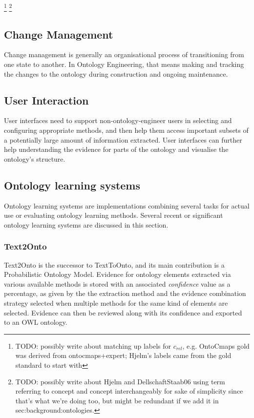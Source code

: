 \documentclass[a4paper]{report}
\newcommand{\todo}[1]{\footnote{{\color{red} TODO: #1}}}
\begin{document}
\todo{possibly write about matching up labels for \(c_{rel}\), e.g. OntoCmaps gold was derived from ontocmaps+expert; Hjelm's labels came from the gold standard to start with}
\todo{possibly write about Hjelm and DellschaftStaab06 using term referring to concept and concept interchangeably for sake of simplicity since that's what we're doing too, but might be redundant if we add it in sec:background:ontologies.}

\subsection{Change Management}

Change management is generally an organisational process of transitioning from one state to another.
In Ontology Engineering, that means making and tracking the changes to the ontology during construction and ongoing maintenance.

\subsection{User Interaction}
\label{subsec:background:ui}

User interfaces need to support non-ontology-engineer users in selecting and configuring appropriate methods, and then help them access important subsets of a potentially large amount of information extracted.
User interfaces can further help understanding the evidence for parts of the ontology and visualise the ontology's structure.

\subsection{Ontology learning systems}

Ontology learning systems are implementations combining several tasks for actual use or evaluating ontology learning methods. Several recent or significant ontology learning systems are discussed in this section.

\subsubsection{Text2Onto}

Text2Onto is the successor to TextToOnto, and its main contribution is a Probabilistic Ontology Model.
Evidence for ontology elements extracted via various available methods is stored with an associated \emph{confidence} value as a percentage, as given by the the extraction method and the evidence combination strategy selected when multiple methods for the same kind of elements are selected.
Evidence can then be reviewed along with its confidence and exported to an OWL ontology.
\end{document}
